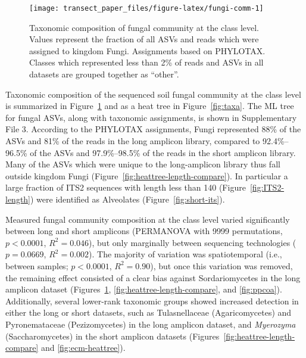 \documentclass[
  12pt,
]{article}
\begin{document}
\begin{figure}

{\centering \texttt{[image: transect\_paper\_files/figure-latex/fungi-comm-1]} 

}

\caption[Taxonomic composition of fungal community at the class level]{Taxonomic composition of fungal community at the class level. Values represent the fraction of all ASVs and reads which were assigned to kingdom Fungi.
Assignments based on PHYLOTAX.
Classes which represented less than 2\% of reads and ASVs in all datasets are grouped together as ``other''.}\label{fig:fungi-comm}
\end{figure}

Taxonomic composition of the sequenced soil fungal community at the class level is summarized in Figure~\ref{fig:fungi-comm} and as a heat tree \autocite{foster2017} in Figure~\ref{fig:taxa}.
The ML tree for fungal ASVs, along with taxonomic assignments, is shown in Supplementary File 3.
According to the PHYLOTAX assignments, Fungi represented 88\% of the ASVs and 81\% of the reads in the long amplicon library, compared to 92.4\%--96.5\% of the ASVs and 97.9\%--98.5\% of the reads in the short amplicon library.
Many of the ASVs which were unique to the long-amplicon library thus fall outside kingdom Fungi (Figure~\ref{fig:heattree-length-compare}).
In particular a large fraction of ITS2 sequences with length less than 140 (Figure~\ref{fig:ITS2-length}) were identified as Alveolates (Figure~\ref{fig:short-its}).

Measured fungal community composition at the class level varied significantly between long and short amplicons (PERMANOVA with 9999 permutations, \(p<0.0001\), \(R^2=0.046\)), but only marginally between sequencing technologies (\(p=0.0669\), \(R^2=0.002\)).
The majority of variation was spatiotemporal (i.e., between samples; \(p<0.0001\), \(R^2=0.90\)), but once this variation was removed, the remaining effect consisted of a clear bias against Sordariomycetes in the long amplicon dataset (Figures~\ref{fig:fungi-comm}, \ref{fig:heattree-length-compare}, and \ref{fig:ppcoa}).
Additionally, several lower-rank taxonomic groups showed increased detection in either the long or short datasets, such as Tulasnellaceae (Agaricomycetes) and Pyronemataceae (Pezizomycetes) in the long amplicon dataset, and \emph{Myerozyma} (Saccharomycetes) in the short amplicon datasets (Figures~\ref{fig:heattree-length-compare} and \ref{fig:ecm-heattree}).
\end{document}

